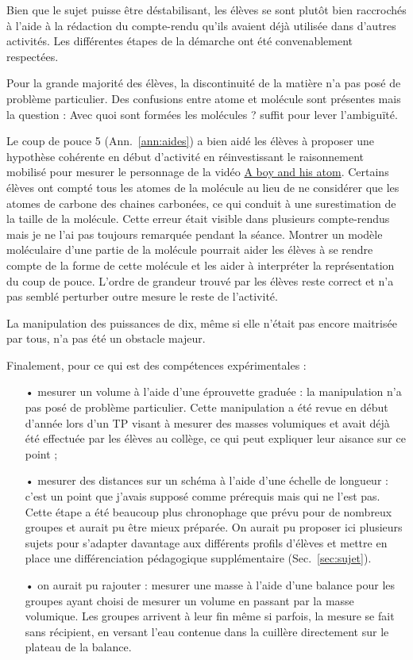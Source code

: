\documentclass[12pt,a4paper, fleqn]{report}
\begin{document}
Bien que le sujet puisse être déstabilisant, les élèves se sont plutôt bien raccrochés à l'aide à la rédaction du compte-rendu qu'ils avaient déjà utilisée dans d'autres activités.
Les différentes étapes de la démarche ont été convenablement respectées.

Pour la grande majorité des élèves, la discontinuité de la matière n'a pas posé de problème particulier.
Des confusions entre atome et molécule sont présentes mais la question : \og Avec quoi sont formées les molécules ? \fg{} suffit pour lever l'ambiguïté.

Le coup de pouce 5 (Ann.~\ref{ann:aides}) a bien aidé les élèves à proposer une hypothèse cohérente en début d'activité en réinvestissant le raisonnement mobilisé pour mesurer le personnage de la vidéo \href{https://youtu.be/oSCX78-8-q0}{A boy and his atom}.
Certains élèves ont compté tous les atomes de la molécule au lieu de ne considérer que les atomes de carbone des chaines carbonées, ce qui conduit à une surestimation de la taille de la molécule.
Cette \og erreur \fg{} était visible dans plusieurs compte-rendus mais je ne l'ai pas toujours remarquée pendant la séance.
Montrer un modèle moléculaire d'une partie de la molécule pourrait aider les élèves à se rendre compte de la forme de cette molécule et les aider à interpréter la représentation du coup de pouce.
L'ordre de grandeur trouvé par les élèves reste correct et n'a pas semblé perturber outre mesure le reste de l'activité.

La manipulation des puissances de dix, même si elle n'était pas encore maitrisée par tous, n'a pas été un obstacle majeur.

Finalement, pour ce qui est des compétences expérimentales :
\begin{itemize}
\item[•] mesurer un volume à l'aide d'une éprouvette graduée : la manipulation n'a pas posé de problème particulier.
Cette manipulation a été revue en début d'année lors d'un TP visant à mesurer des masses volumiques et avait déjà été effectuée par les élèves au collège, ce qui peut expliquer leur aisance sur ce point ;
\item[•] mesurer des distances sur un schéma à l'aide d'une échelle de longueur : c'est un point que j'avais supposé comme prérequis mais qui ne l'est pas.
Cette étape a été beaucoup plus chronophage que prévu pour de nombreux groupes et aurait pu être mieux préparée.
On aurait pu proposer ici plusieurs sujets pour s'adapter davantage aux différents profils d'élèves et mettre en place une différenciation pédagogique supplémentaire (Sec.~\ref{sec:sujet}).
\item[•] on aurait pu rajouter : mesurer une masse à l'aide d'une balance pour les groupes ayant choisi de mesurer un volume en passant par la masse volumique.
Les groupes arrivent à leur fin même si parfois, la mesure se fait sans récipient, en versant l'eau contenue dans la cuillère directement sur le plateau de la balance.
\end{itemize}
\end{document}
